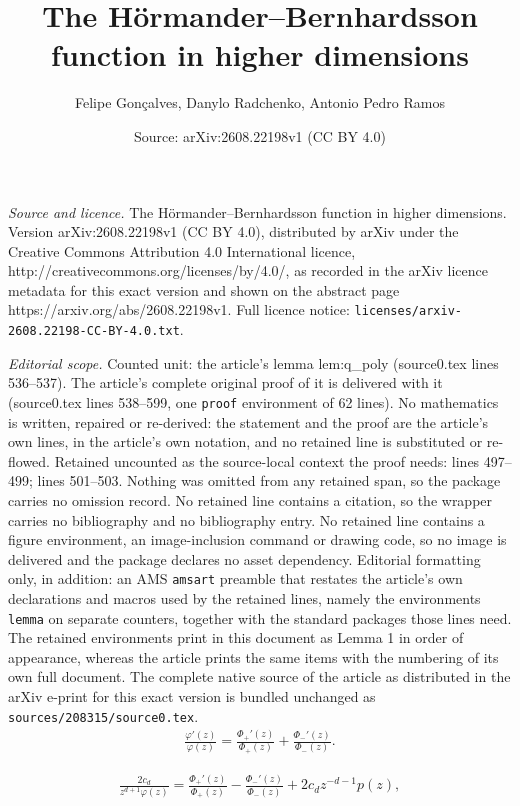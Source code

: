 \documentclass[10pt,a4paper]{amsart}
\title{The Hörmander--Bernhardsson function in higher dimensions}
\author{Felipe Gon\c{c}alves, Danylo Radchenko, Antonio Pedro Ramos}
\date{Source: arXiv:2608.22198v1 (CC BY 4.0)}
\renewcommand{\P}{\Phi}
\newcommand{\p}{\varphi}
\begin{document}
\maketitle

\noindent\emph{Source and licence.} The Hörmander--Bernhardsson function in higher dimensions. Version arXiv:2608.22198v1 (CC BY 4.0), distributed by arXiv under the Creative Commons Attribution 4.0 International licence, http://creativecommons.org/licenses/by/4.0/, as recorded in the arXiv licence metadata for this exact version and shown on the abstract page https://arxiv.org/abs/2608.22198v1. Full licence notice: \texttt{licenses/arxiv-2608.22198-CC-BY-4.0.txt}.\par\smallskip

\noindent\textit{Editorial scope.} Counted unit: the article's lemma lem:q\_poly (source0.tex lines 536--537). The article's complete original proof of it is delivered with it (source0.tex lines 538--599, one \texttt{proof} environment of 62 lines). No mathematics is written, repaired or re-derived: the statement and the proof are the article's own lines, in the article's own notation, and no retained line is substituted or re-flowed.  Retained uncounted as the source-local context the proof needs: lines 497--499; lines 501--503.  Nothing was omitted from any retained span, so the package carries no omission record.  No retained line contains a citation, so the wrapper carries no bibliography and no bibliography entry.  No retained line contains a figure environment, an image-inclusion command or drawing code, so no image is delivered and the package declares no asset dependency.  Editorial formatting only, in addition: an AMS \texttt{amsart} preamble that restates the article's own declarations and macros used by the retained lines, namely the environments \texttt{lemma} on separate counters, together with the standard packages those lines need.  The retained environments print in this document as Lemma 1 in order of appearance, whereas the article prints the same items with the numbering of its own full document.  The complete native source of the article as distributed in the arXiv e-print for this exact version is bundled unchanged as \texttt{sources/208315/source0.tex}.
\begin{align}\label{id:philogder}
\frac{\p'(z)}{\p(z)}=\frac{\P_+'(z)}{\P_+(z)}+\frac{\P_-'(z)}{\P_-(z)}.
\end{align}

\begin{align}\label{id:recphi}
   \frac{2c_d}{z^{d+1}\p(z)} = \frac{\P_+'(z)}{\P_+(z)}-\frac{\P_-'(z)}{\P_-(z)} +2c_d z^{-d-1}p(z),
\end{align}
\end{document}
